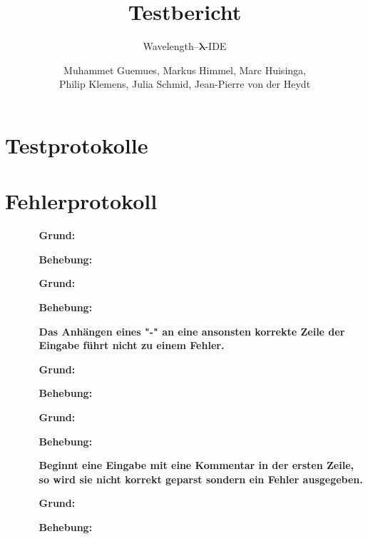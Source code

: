 \documentclass[parskip=full,11pt]{scrartcl}
\title{Testbericht}
\subtitle{Wavelength--$\bm{\lambda}$-IDE}
\author{Muhammet Guemues, Markus Himmel, Marc Huisinga,\\Philip Klemens, Julia Schmid, Jean-Pierre von der Heydt}
\begin{document}
\maketitle
\newpage
\tableofcontents
\newpage

\section{Testprotokolle}

\section{Fehlerprotokoll}

\begin{itemize}[itemsep=3ex]

\item[] %
\begin{itemize}[noitemsep]
\item[] {\bfseries }
\item [\textbf{Grund:}]
\item [\textbf{Behebung:}]
\end{itemize}

\item[] %
\begin{itemize}[noitemsep]
\item[] {\bfseries }
\item [\textbf{Grund:}]
\item [\textbf{Behebung:}]
\end{itemize}

\item[] %
\begin{itemize}[noitemsep]
\item[] {\bfseries  Das Anhängen eines "-" an eine ansonsten korrekte Zeile der Eingabe führt nicht zu einem Fehler. }
\item [\textbf{Grund:}]
\item [\textbf{Behebung:}]
\end{itemize}

\item[] %
\begin{itemize}[noitemsep]
\item[] {\bfseries  }
\item [\textbf{Grund:}]
\item [\textbf{Behebung:}]
\end{itemize}

\item[] %
\begin{itemize}[noitemsep]
\item[] {\bfseries  Beginnt eine Eingabe mit eine Kommentar in der ersten Zeile, so wird sie nicht korrekt geparst sondern ein Fehler ausgegeben. }
\item [\textbf{Grund:}]
\item [\textbf{Behebung:}]
\end{itemize}


\end{itemize}
\end{document}

